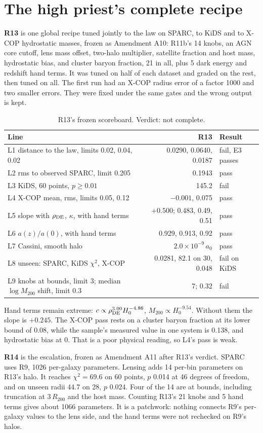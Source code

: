 \documentclass[11pt]{article}
\begin{document}
\section{The high priest's complete recipe}
\textbf{R13} is one global recipe tuned jointly to the law on SPARC, to KiDS and to X-COP hydrostatic masses, frozen as Amendment A10: R11b's 14 knobs, an AGN core cutoff, lens mass offset, two-halo multiplier, satellite fraction and host mass, hydrostatic bias, and cluster baryon fraction, 21 in all, plus 5 dark energy and redshift hand terms. It was tuned on half of each dataset and graded on the rest, then tuned on all. The first run had an X-COP radius error of a factor 1000 and two smaller errors. They were fixed under the same gates and the wrong output is kept.
\begin{table}[h]\centering\small
\begin{tabular}{lrl}
\toprule
Line & R13 & Result\\
\midrule
L1 distance to the law, limits 0.02, 0.04, 0.02 & 0.0290, 0.0640, 0.0187 & fail, E3 passes\\
L2 rms to observed SPARC, limit 0.205 & 0.1943 & pass\\
L3 KiDS, 60 points, $p\ge0.01$ & 145.2 & fail\\
L4 X-COP mean, rms, limits 0.05, 0.12 & $-0.001$, 0.075 & pass\\
L5 slope with $\rho_{\rm DE}$, $\kappa$, with hand terms & $+0.500$; 0.483, 0.49, 0.51 & pass\\
L6 $a(z)/a(0)$, with hand terms & 0.929, 0.913, 0.92 & pass\\
L7 Cassini, smooth halo & $2.0\times10^{-9}\,a_0$ & pass\\
L8 unseen: SPARC, KiDS $\chi^2$, X-COP & 0.0281, 82.1 on 30, 0.048 & fail on KiDS\\
L9 knobs at bounds, limit 3; median $\log M_{200}$ shift, limit 0.3 & 7; 0.32 & fail\\
\bottomrule
\end{tabular}
\caption{R13's frozen scoreboard. Verdict: not complete.}
\end{table}
Hand terms remain extreme: $c\propto\rho_{\rm DE}^{3.00}H_0^{-4.86}$, $M_{200}\propto H_0^{-9.54}$. Without them the slope is $+0.245$. The X-COP pass rests on a cluster baryon fraction at its lower bound of 0.08, while the sample's measured value in one system is 0.138, and hydrostatic bias at 0. That is a poor physical reading, so L4's pass is weak.

\textbf{R14} is the escalation, frozen as Amendment A11 after R13's verdict. SPARC uses R9, 1026 per-galaxy parameters. Lensing adds 14 per-bin parameters on R13's halo. It reaches $\chi^2=69.6$ on 60 points, $p$ 0.014 at 46 degrees of freedom, and on unseen radii 44.7 on 28, $p$ 0.024. Four of the 14 are at bounds, including truncation at 3\,$R_{200}$ and the host mass. Counting R13's 21 knobs and 5 hand terms gives about 1066 parameters. It is a patchwork: nothing connects R9's per-galaxy values to the lens side, and the hand terms were not rechecked on R9's halos.
\end{document}
